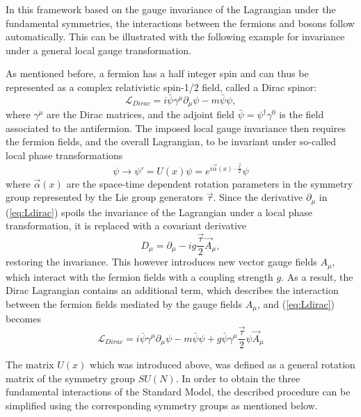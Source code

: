 In this framework based on the gauge invariance of the Lagrangian under the fundamental symmetries, the interactions between the fermions and bosons follow automatically. This can be illustrated with the following example for invariance under a general local gauge transformation.

As mentioned before, a fermion has a half integer spin and can thus be represented as a complex relativistic spin-1/2 field, called a Dirac spinor:
\begin{equation}
\label{eq:Ldirac}
 \mathcal{L}_{Dirac} = i\bar{\psi}\gamma^{\mu}\partial_{\mu}\psi - m\bar{\psi}\psi,
\end{equation}
where $\gamma^{\mu}$ are the Dirac matrices, and the adjoint field $\bar{\psi} = \psi^{\dagger}\gamma^0$ is the field associated to the antifermion. The imposed local gauge invariance then requires the fermion fields, and the overall Lagrangian, to be invariant under so-called local phase transformations
\begin{equation}
 \psi \rightarrow \psi' = U(x)\psi = e^{i\vec{\alpha}(x)\cdot\frac{\vec{\tau}}{2}}\psi
\end{equation}
where $\vec{\alpha}(x)$ are the space-time dependent rotation parameters in the symmetry group represented by the Lie group generators $\vec{\tau}$. Since the derivative $\partial_{\mu}$ in (\ref{eq:Ldirac}) spoils the invariance of the Lagrangian under a local phase transformation, it is replaced with a covariant derivative 
\begin{equation}
 D_{\mu} = \partial_{\mu} - ig\frac{\vec{\tau}}{2}\vec{A}_{\mu}, 
\end{equation}
restoring the invariance. This however introduces new vector gauge fields $A_{\mu}$, which interact with the fermion fields with a coupling strength $g$. As a result, the Dirac Lagrangian contains an additional term, which describes the interaction between the fermion fields mediated by the gauge fields $A_{\mu}$, and (\ref{eq:Ldirac}) becomes
\begin{equation}
  \mathcal{L}_{Dirac} = i\bar{\psi}\gamma^{\mu}\partial_{\mu}\psi - m\bar{\psi}\psi + g\bar{\psi}\gamma^{\mu}\frac{\vec{\tau}}{2}\psi\vec{A}_{\mu}
\end{equation}

The matrix $U(x)$ which was introduced above, was defined as a general rotation matrix of the symmetry group $SU(N)$. In order to obtain the three fundamental interactions of the Standard Model, the described procedure can be simplified using the corresponding symmetry groups as mentioned below.

